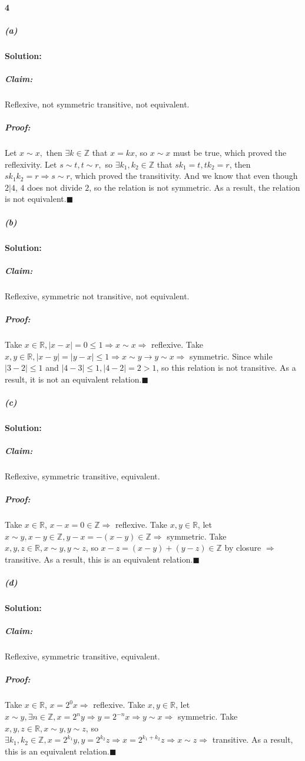 \documentclass[11pt]{article}
\begin{document}
	\paragraph{4}
		\subparagraph{(a)}\textbf{Solution:}
			\subparagraph{Claim:} Reflexive, not symmetric transitive, not equivalent.
			\subparagraph{Proof:}Let $x \sim x,$ then $\exists k \in \mathbb{Z}$ that $x = kx$, so $x \sim x$ must be true, which proved the reflexivity. Let $s \sim t, t \sim r,$ so $\exists k_1, k_2 \in \mathbb{Z}$ that $sk_1 = t, tk_2 = r$, then $sk_1k_2 = r \Rightarrow s \sim r$, which proved the transitivity. And we know that even though $2 | 4$, $4$ does not divide $2$, so the relation is not symmetric. As a result, the relation is not equivalent.$\blacksquare$
		\subparagraph{(b)}
			\textbf{Solution:}
			\subparagraph{Claim:} Reflexive, symmetric not transitive, not equivalent.
			\subparagraph{Proof:} Take $x \in \mathbb{R}, |x - x| = 0 \leq 1 \Rightarrow x \sim x \Rightarrow$ reflexive. Take $x, y \in \mathbb{R}, |x - y| = |y - x| \leq 1 \Rightarrow x \sim y \rightarrow y \sim x \Rightarrow$ symmetric. Since while $|3 - 2| \leq 1$ and $|4 - 3| \leq 1, |4 - 2| = 2 > 1$, so this relation is not transitive. As a result, it is not an equivalent relation.$\blacksquare$
		\subparagraph{(c)}
			\textbf{Solution:}
			\subparagraph{Claim:} Reflexive, symmetric transitive, equivalent.
			\subparagraph{Proof:}
			Take $x \in \mathbb{R}$, $x - x = 0 \in \mathbb{Z} \Rightarrow$ reflexive. Take $x, y \in \mathbb{R}$, let $x \sim y, x - y \in \mathbb{Z}, y - x = -(x - y) \in \mathbb{Z} \Rightarrow$ symmetric. Take $x, y, z \in \mathbb{R}, x \sim y, y \sim z$, so $x - z = (x - y) + (y - z) \in \mathbb{Z}$ by closure $\Rightarrow$ transitive. As a result, this is an equivalent relation.$\blacksquare$
		\subparagraph{(d)}
			\textbf{Solution:}
			\subparagraph{Claim:} Reflexive, symmetric transitive, equivalent.
			\subparagraph{Proof:} Take $x \in \mathbb{R}$, $x = 2^0x \Rightarrow$ reflexive. Take $x, y \in \mathbb{R}$, let $x \sim y, \exists n \in \mathbb{Z}, x = 2^ny \Rightarrow y = 2^{-n}x \Rightarrow y \sim x \Rightarrow$ symmetric. Take $x, y, z \in \mathbb{R}, x \sim y, y \sim z$, so $\exists k_1, k_2 \in \mathbb{Z}, x = 2^{k_1}y, y = 2^{k_2}z \Rightarrow x = 2^{k_1 + k_2}z \Rightarrow x \sim z \Rightarrow$ transitive. As a result, this is an equivalent relation.$\blacksquare$
\end{document}
